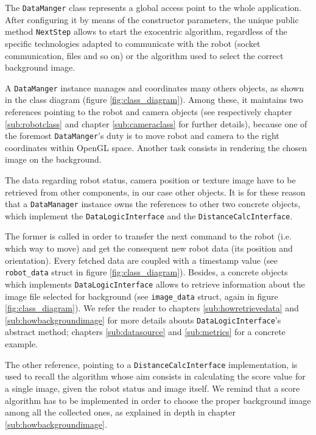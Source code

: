 The \texttt{DataManger} class represents a global access point to the whole application.
After configuring it by means of the constructor parameters, the unique public method \texttt{NextStep}
allows to start the exocentric algorithm, regardless of the specific technologies adapted to
communicate with the robot (socket communication, files and so on) or the algorithm used to select
the correct background image.
%

%
A \texttt{DataManger} instance manages and coordinates many others objects, as shown in the class
diagram (figure \ref {fig:class_diagram}). Among these, it maintains two references pointing to the
robot and camera objects (see respectively chapter \ref{sub:robotclass} and chapter \ref{sub:cameraclass} 
for further details), because one of the foremost \texttt{DataManger}'s duty is to move robot and camera
to the right coordinates within OpenGL space. Another task consists in rendering the chosen image on the
background.
%

%
The data regarding robot status, camera position or texture image have to be retrieved from other components,
in our case other objects. It is for these reason that a \texttt{DataManager} instance owns the references to
other two concrete objects, which implement the \texttt{DataLogicInterface} and the \newline
\texttt{DistanceCalcInterface}.
%

%
The former is called in order to transfer the next command to the robot (i.e. which way to move) and get the
consequent new robot data (its position and orientation). Every fetched data are coupled with a timestamp value
(see \texttt{robot\_data} struct in figure \ref {fig:class_diagram}). Besides, a concrete objects which implements
\texttt{DataLogicInterface} allows to retrieve information about the image file selected for background
(see \texttt{image\_data} struct, again in figure \ref {fig:class_diagram}). We refer the reader to chapters
\ref{sub:howretrievedata} and \ref{sub:howbackgroundimage} for more details abouts \texttt{DataLogicInterface}'s
abstract method; chapters \ref{sub:datasource} and \ref{sub:metrics} for a concrete example.
%

%
The other reference, pointing to a \texttt{DistanceCalcInterface} implementation, is used to recall the algorithm
whose aim consists in calculating the score value for a single image, given the robot status and image itself. We
remind that a score algorithm has to be implemented in order to choose the proper background image among all the
collected ones, as explained in depth in chapter \ref{sub:howbackgroundimage}.
%

